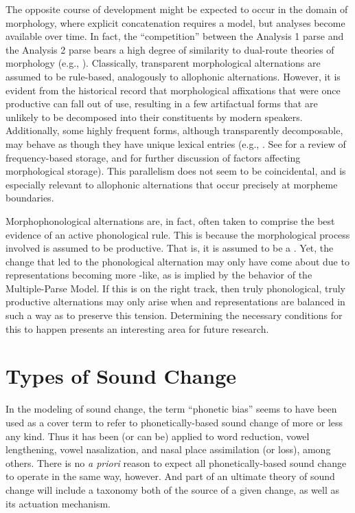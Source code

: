 The opposite course of development might be expected to occur in the
domain of morphology, where explicit concatenation requires a 
model, but  analyses become available over time. In fact,
the “competition” between the Analysis 1 parse and the Analysis
2 parse bears a high degree of similarity to dual-route theories of
morphology (e.g., \citealt{caramazza1988lexical,frauenfelder1992constraining}).
Classically, transparent morphological alternations are assumed to
be rule-based, analogously to allophonic alternations. However, it
is evident from the historical record that morphological affixations
that were once productive can fall out of use, resulting in a few
artifactual forms that are unlikely to be decomposed into their constituents
by modern speakers. Additionally, some highly frequent forms, although
transparently decomposable, may behave as though they have unique
lexical entries (e.g., \citet{baayen1997singulars}. See \citet{levelt1999theory}
for a review of frequency-based storage, and \citet{burani1987representation,baayen1993frequency}
for further discussion of factors affecting morphological storage).
This parallelism does not seem to be coincidental, and is especially
relevant to allophonic alternations that occur precisely at morpheme
boundaries.

Morphophonological alternations are, in fact, often taken to comprise
the best evidence of an active phonological rule. This is because
the morphological process involved is assumed to be productive. That
is, it is assumed to be a . Yet, the change that led
to the phonological alternation may only have come about due to representations
becoming more -like, as is implied by the behavior of
the Multiple-Parse Model. If this is on the right track, then truly
phonological, truly productive alternations may only arise when 
and  representations are balanced in such a way as to
preserve this tension. Determining the necessary conditions for this
to happen presents an interesting area for future research.

\section{Types of Sound Change}

In the modeling of sound change, the term “phonetic bias” seems
to have been used as a cover term to refer to phonetically-based sound
change of more or less any kind. Thus it has been (or can be) applied
to word reduction, vowel lengthening, vowel nasalization, and nasal
place assimilation (or loss), among others. There is no \emph{a priori}
reason to expect all phonetically-based sound change to operate in
the same way, however. And part of an ultimate theory of sound change
will include a taxonomy both of the source of a given change, as well
as its actuation mechanism. 

